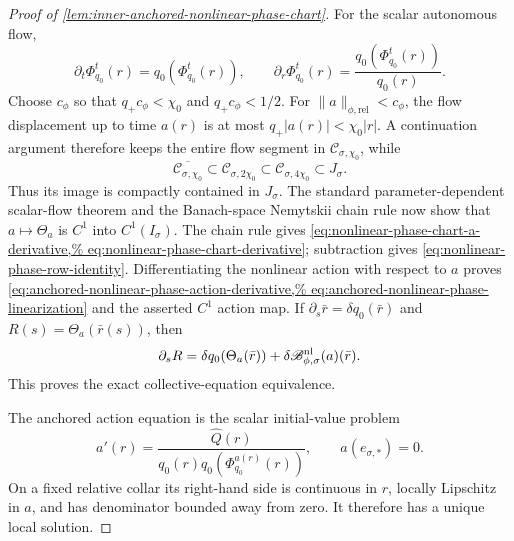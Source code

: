 \begin{proof}[Proof of
\cref{lem:inner-anchored-nonlinear-phase-chart}]
For the scalar autonomous flow,
\begin{equation}
 \partial_t\Phi_{q_0}^t(r)=q_0(\Phi_{q_0}^t(r)),\qquad
 \partial_r\Phi_{q_0}^t(r)
 =\frac{q_0(\Phi_{q_0}^t(r))}{q_0(r)}.             \label{eq:anchored-phase-flow-derivatives}
\end{equation}
Choose \(c_\phi\) so that \(q_+c_\phi<\chi_0\) and
\(q_+c_\phi<1/2\).  For
\(\|a\|_{\phi,\mathrm{rel}}<c_\phi\), the flow displacement up to time
\(a(r)\) is at most \(q_+|a(r)|<\chi_0|r|\).  A continuation argument
therefore keeps the entire flow segment in
\(\mathcal C_{\sigma,\chi_0}\), while
\[
 \overline{\mathcal C_{\sigma,\chi_0}}
 \subset\mathcal C_{\sigma,2\chi_0}
 \subset\mathcal C_{\sigma,4\chi_0}
 \subset J_\sigma.
\]
Thus its image is compactly contained in \(J_\sigma\).
The standard parameter-dependent scalar-flow theorem and the Banach-space
Nemytskii chain rule now show that
\(a\mapsto\Theta_a\) is \(C^1\) into \(C^1(I_\sigma)\).
The chain rule gives
\cref{eq:nonlinear-phase-chart-a-derivative,%
eq:nonlinear-phase-chart-derivative}; subtraction gives
\cref{eq:nonlinear-phase-row-identity}.  Differentiating the nonlinear
action with respect to \(a\) proves
\cref{eq:anchored-nonlinear-phase-action-derivative,%
eq:anchored-nonlinear-phase-linearization} and the asserted \(C^1\)
action map.  If
\(\partial_s\bar r=\delta q_0(\bar r)\) and
\(R(s)=\Theta_a(\bar r(s))\), then
\[
 \partial_sR
 =\delta q_0(\Theta_a(\bar r))
   +\delta\mathscr B_{\phi,\sigma}^{\rm nl}(a)(\bar r).
\]
This proves the exact collective-equation equivalence.

The anchored action equation is the scalar initial-value problem
\begin{equation}
 a'(r)=\frac{\widehat Q(r)}
 {q_0(r)q_0(\Phi_{q_0}^{a(r)}(r))},\qquad
 a(e_{\sigma,*})=0.                               \label{eq:anchored-phase-explicit-IVP}
\end{equation}
On a fixed relative collar its right-hand side is continuous in \(r\),
locally Lipschitz in \(a\), and has denominator bounded away from zero.
It therefore has a unique local solution.


\end{proof}
